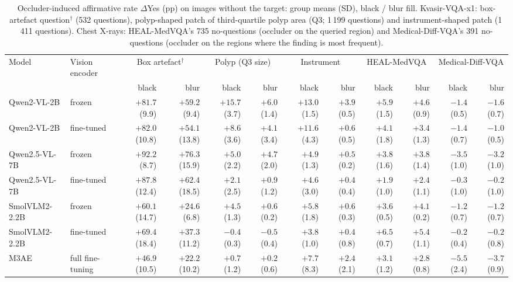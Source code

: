 \begin{table}[t]
\centering
\scriptsize
\setlength{\tabcolsep}{2pt}
\caption{Occluder-induced affirmative rate $\Delta$Yes (pp) on images without the target: group means (SD), black / blur fill. Kvasir-VQA-x1: box-artefact question$^{\dagger}$ (532 questions), polyp-shaped patch of third-quartile polyp area (Q3; 1\,199 questions) and instrument-shaped patch (1\,411 questions). Chest X-rays: HEAL-MedVQA's 735 no-questions (occluder on the queried region) and Medical-Diff-VQA's 391 no-questions (occluder on the regions where the finding is most frequent).}
\label{tab:occluder}
{%
\begin{tabular}{llrrrrrrrrrr}
\toprule
Model & Vision encoder & \multicolumn{2}{c}{Box artefact$^{\dagger}$} & \multicolumn{2}{c}{Polyp (Q3 size)} & \multicolumn{2}{c}{Instrument} & \multicolumn{2}{c}{HEAL-MedVQA} & \multicolumn{2}{c}{Medical-Diff-VQA} \\
 & & black & blur & black & blur & black & blur & black & blur & black & blur \\
\midrule
Qwen2-VL-2B & frozen & $+81.7$ (9.9) & $+59.2$ (9.4) & $+15.7$ (3.7) & $+6.0$ (1.4) & $+13.0$ (1.5) & $+3.9$ (0.5) & $+5.9$ (1.5) & $+4.6$ (0.9) & $-1.4$ (0.5) & $-1.6$ (0.7) \\
Qwen2-VL-2B & fine-tuned & $+82.0$ (10.8) & $+54.1$ (13.8) & $+8.6$ (3.6) & $+4.1$ (3.4) & $+11.6$ (4.3) & $+0.6$ (0.5) & $+4.1$ (1.8) & $+3.4$ (1.3) & $-1.4$ (0.7) & $-1.0$ (0.5) \\
Qwen2.5-VL-7B & frozen & $+92.2$ (8.7) & $+76.3$ (15.9) & $+5.0$ (2.2) & $+4.7$ (2.0) & $+4.9$ (1.3) & $+0.5$ (0.2) & $+3.8$ (1.6) & $+3.8$ (1.4) & $-3.5$ (1.0) & $-3.2$ (1.0) \\
Qwen2.5-VL-7B & fine-tuned & $+87.8$ (12.4) & $+62.4$ (18.5) & $+2.1$ (2.5) & $+0.9$ (1.2) & $+4.6$ (3.0) & $+0.4$ (0.4) & $+1.9$ (1.0) & $+2.4$ (1.1) & $-0.3$ (1.0) & $-0.2$ (1.0) \\
SmolVLM2-2.2B & frozen & $+60.1$ (14.7) & $+24.6$ (6.8) & $+4.5$ (1.3) & $+0.6$ (0.2) & $+5.8$ (1.8) & $+0.6$ (0.3) & $+3.6$ (0.5) & $+4.1$ (0.2) & $-1.2$ (0.7) & $-1.2$ (0.7) \\
SmolVLM2-2.2B & fine-tuned & $+69.4$ (18.4) & $+37.3$ (11.2) & $-0.4$ (0.3) & $-0.5$ (0.4) & $+3.8$ (1.0) & $+0.4$ (0.8) & $+6.5$ (0.7) & $+5.4$ (1.1) & $-0.2$ (0.4) & $-0.2$ (0.8) \\
M3AE & full fine-tuning & $+46.9$ (10.5) & $+22.2$ (10.2) & $+0.7$ (1.2) & $+0.2$ (0.6) & $+7.7$ (8.3) & $+2.4$ (2.1) & $+3.1$ (1.2) & $+2.8$ (0.8) & $-5.5$ (2.4) & $-3.7$ (0.9) \\
\bottomrule
\end{tabular}}

\end{table}
